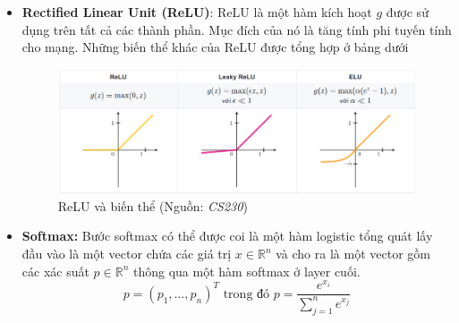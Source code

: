 \documentclass[a4paper, 12pt]{report}
\begin{document}
\begin{itemize}
	\item \textbf{Rectified Linear Unit (ReLU)}: ReLU là một hàm kích hoạt $g$ được sử dụng trên tất cả các thành phần. Mục đích của nó là tăng tính phi tuyến tính cho mạng. Những biến thể khác của ReLU được tổng hợp ở bảng dưới\par
	\begin{figure}[h!]
		\centering
		\includegraphics[width=1\linewidth]{Images/relu1}
		\caption{ReLU và biến thể (Nguồn: \textit{CS230})}
		\label{fig:relu1}
	\end{figure}
	\item \textbf{Softmax:} Bước softmax có thể được coi là một hàm logistic tổng quát lấy đầu vào là một vector chứa các giá trị $x \in \mathbb{R}^n$ và cho ra là một vector gồm các xác suất $p \in \mathbb{R}^n$ thông qua một hàm softmax ở layer cuối.
	$$ p = (p_1,\dots,p_n)^T \text{ trong đó } p = \frac{e^{x_i}}{\displaystyle\sum_{j=1}^ne^{x_j}} $$
\end{itemize}
\end{document}
